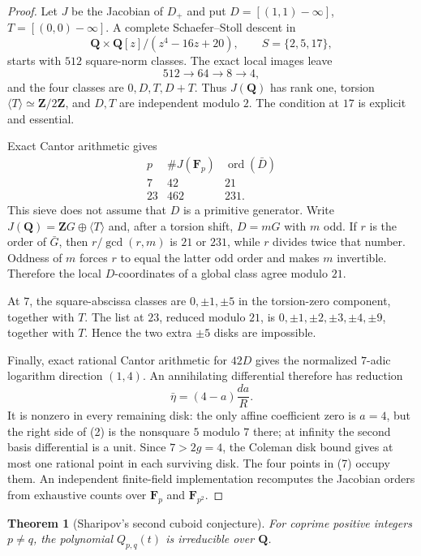 \documentclass[11pt]{article}
\newtheorem{theorem}{Theorem}
\begin{document}
\begin{proof}
Let $J$ be the Jacobian of $D_+$ and put
$D=[(1,1)-\infty]$, $T=[(0,0)-\infty]$.  A complete
Schaefer--Stoll descent in
\[
 \mathbf Q\times\mathbf Q[z]/(z^4-16z+20),\qquad
 S=\{2,5,17\},
\]
starts with $512$ square-norm classes.  The exact local images leave
\[
 512\longrightarrow64\longrightarrow8\longrightarrow4,
\]
and the four classes are $0,D,T,D+T$.  Thus $J(\mathbf Q)$ has rank one,
torsion $\langle T\rangle\simeq\mathbf Z/2\mathbf Z$, and $D,T$ are
independent modulo $2$.  The condition at $17$ is explicit and essential.

Exact Cantor arithmetic gives
\[
\begin{array}{c|cc}
p&\#J(\mathbf F_p)&\operatorname{ord}(\bar D)\\ \hline
7&42&21\\
23&462&231.
\end{array}
\]
This sieve does not assume that $D$ is a primitive generator.  Write
$J(\mathbf Q)=\mathbf ZG\oplus\langle T\rangle$ and, after a torsion shift,
$D=mG$ with $m$ odd.  If $r$ is the order of $\bar G$, then
$r/\gcd(r,m)$ is $21$ or $231$, while $r$ divides twice that number.
Oddness of $m$ forces $r$ to equal the latter odd order and makes $m$
invertible.  Therefore the local $D$-coordinates of a global class agree
modulo $21$.

At $7$, the square-abscissa classes are $0,\pm1,\pm5$ in the torsion-zero
component, together with $T$.  The list at $23$, reduced modulo $21$, is
$0,\pm1,\pm2,\pm3,\pm4,\pm9$, together with $T$.  Hence the two extra
$\pm5$ disks are impossible.

Finally, exact rational Cantor arithmetic for $42D$ gives the normalized
$7$-adic logarithm direction $(1,4)$.  An annihilating differential therefore
has reduction
\[
 \bar\eta=(4-a)\frac{da}{R}.
\]
It is nonzero in every remaining disk: the only affine coefficient zero is
$a=4$, but the right side of (2) is the nonsquare $5$ modulo $7$ there; at
infinity the second basis differential is a unit.  Since $7>2g=4$, the
Coleman disk bound gives at most one rational point in each surviving disk.
The four points in (7) occupy them.  An independent finite-field
implementation recomputes the Jacobian orders from exhaustive counts over
$\mathbf F_p$ and $\mathbf F_{p^2}$.
\end{proof}

\begin{theorem}[Sharipov's second cuboid conjecture]
For coprime positive integers $p\ne q$, the polynomial $Q_{p,q}(t)$ is
irreducible over $\mathbf Q$.
\end{theorem}
\end{document}
